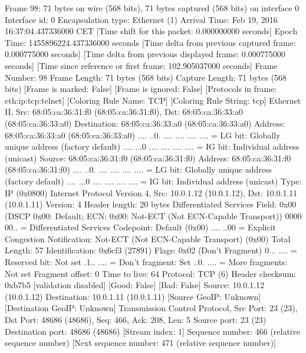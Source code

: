 Frame 98: 71 bytes on wire (568 bits), 71 bytes captured (568 bits) on interface 0
    Interface id: 0
    Encapsulation type: Ethernet (1)
    Arrival Time: Feb 19, 2016 16:37:04.437336000 CET
    [Time shift for this packet: 0.000000000 seconds]
    Epoch Time: 1455896224.437336000 seconds
    [Time delta from previous captured frame: 0.000775000 seconds]
    [Time delta from previous displayed frame: 0.000775000 seconds]
    [Time since reference or first frame: 102.905037000 seconds]
    Frame Number: 98
    Frame Length: 71 bytes (568 bits)
    Capture Length: 71 bytes (568 bits)
    [Frame is marked: False]
    [Frame is ignored: False]
    [Protocols in frame: eth:ip:tcp:telnet]
    [Coloring Rule Name: TCP]
    [Coloring Rule String: tcp]
Ethernet II, Src: 68:05:ca:36:31:f0 (68:05:ca:36:31:f0), Dst: 68:05:ca:36:33:a0 (68:05:ca:36:33:a0)
    Destination: 68:05:ca:36:33:a0 (68:05:ca:36:33:a0)
        Address: 68:05:ca:36:33:a0 (68:05:ca:36:33:a0)
        .... ..0. .... .... .... .... = LG bit: Globally unique address (factory default)
        .... ...0 .... .... .... .... = IG bit: Individual address (unicast)
    Source: 68:05:ca:36:31:f0 (68:05:ca:36:31:f0)
        Address: 68:05:ca:36:31:f0 (68:05:ca:36:31:f0)
        .... ..0. .... .... .... .... = LG bit: Globally unique address (factory default)
        .... ...0 .... .... .... .... = IG bit: Individual address (unicast)
    Type: IP (0x0800)
Internet Protocol Version 4, Src: 10.0.1.12 (10.0.1.12), Dst: 10.0.1.11 (10.0.1.11)
    Version: 4
    Header length: 20 bytes
    Differentiated Services Field: 0x00 (DSCP 0x00: Default; ECN: 0x00: Not-ECT (Not ECN-Capable Transport))
        0000 00.. = Differentiated Services Codepoint: Default (0x00)
        .... ..00 = Explicit Congestion Notification: Not-ECT (Not ECN-Capable Transport) (0x00)
    Total Length: 57
    Identification: 0x6cf3 (27891)
    Flags: 0x02 (Don't Fragment)
        0... .... = Reserved bit: Not set
        .1.. .... = Don't fragment: Set
        ..0. .... = More fragments: Not set
    Fragment offset: 0
    Time to live: 64
    Protocol: TCP (6)
    Header checksum: 0xb7b5 [validation disabled]
        [Good: False]
        [Bad: False]
    Source: 10.0.1.12 (10.0.1.12)
    Destination: 10.0.1.11 (10.0.1.11)
    [Source GeoIP: Unknown]
    [Destination GeoIP: Unknown]
Transmission Control Protocol, Src Port: 23 (23), Dst Port: 48686 (48686), Seq: 466, Ack: 208, Len: 5
    Source port: 23 (23)
    Destination port: 48686 (48686)
    [Stream index: 1]
    Sequence number: 466    (relative sequence number)
    [Next sequence number: 471    (relative sequence number)]
